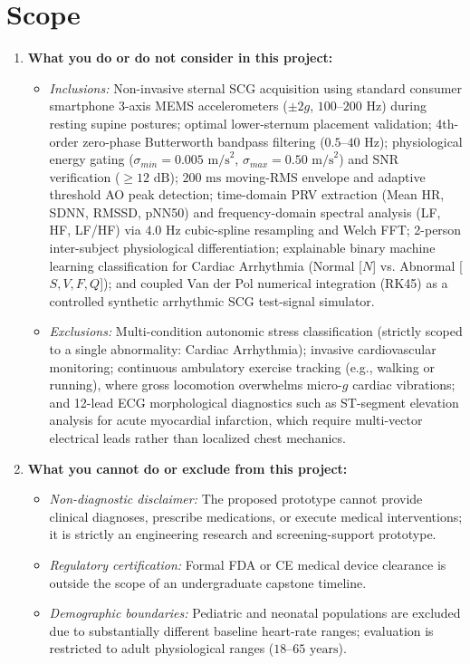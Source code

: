 \section{Scope}
\begin{enumerate}
	\item \textbf{What you do or do not consider in this project:}
	\begin{itemize}
		\item \textit{Inclusions:} Non-invasive sternal SCG acquisition using standard consumer smartphone 3-axis MEMS accelerometers ($\pm 2g$, $100\text{--}200\text{ Hz}$) during resting supine postures; optimal lower-sternum placement validation; 4th-order zero-phase Butterworth bandpass filtering ($0.5\text{--}40\text{ Hz}$); physiological energy gating ($\sigma_{min} = 0.005\text{ m/s}^2$, $\sigma_{max} = 0.50\text{ m/s}^2$) and SNR verification ($\ge 12\text{ dB}$); $200\text{ ms}$ moving-RMS envelope and adaptive threshold AO peak detection; time-domain PRV extraction (Mean HR, SDNN, RMSSD, pNN50) and frequency-domain spectral analysis (LF, HF, LF/HF) via $4.0\text{ Hz}$ cubic-spline resampling and Welch FFT; 2-person inter-subject physiological differentiation; explainable binary machine learning classification for Cardiac Arrhythmia (Normal [$N$] vs. Abnormal [$S, V, F, Q$]); and coupled Van der Pol numerical integration (RK45) as a controlled synthetic arrhythmic SCG test-signal simulator.
		\item \textit{Exclusions:} Multi-condition autonomic stress classification (strictly scoped to a single abnormality: Cardiac Arrhythmia); invasive cardiovascular monitoring; continuous ambulatory exercise tracking (e.g., walking or running), where gross locomotion overwhelms micro-$g$ cardiac vibrations; and 12-lead ECG morphological diagnostics such as ST-segment elevation analysis for acute myocardial infarction, which require multi-vector electrical leads rather than localized chest mechanics.
	\end{itemize}
	
	\item \textbf{What you cannot do or exclude from this project:}
	\begin{itemize}
		\item \textit{Non-diagnostic disclaimer:} The proposed prototype cannot provide clinical diagnoses, prescribe medications, or execute medical interventions; it is strictly an engineering research and screening-support prototype.
		\item \textit{Regulatory certification:} Formal FDA or CE medical device clearance is outside the scope of an undergraduate capstone timeline.
		\item \textit{Demographic boundaries:} Pediatric and neonatal populations are excluded due to substantially different baseline heart-rate ranges; evaluation is restricted to adult physiological ranges ($18\text{--}65\text{ years}$).
	\end{itemize}
	

\end{enumerate}
